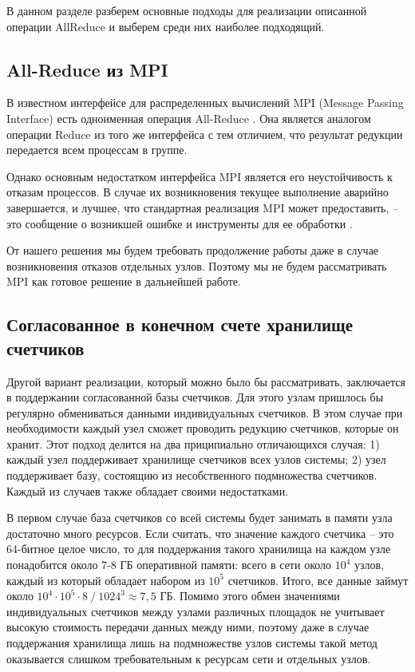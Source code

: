 \documentclass{article}
\theoremstyle{plain}
\theoremstyle{plain}
\theoremstyle{plain}
\theoremstyle{plain}
\theoremstyle{definition}
\theoremstyle{remark}
\theoremstyle{plain}
\begin{document}
В данном разделе разберем основные подходы для реализации описанной операции AllReduce и выберем среди них наиболее подходящий.

\subsection{All-Reduce из MPI}

В известном интерфейсе для распределенных вычислений MPI (Message Passing In\-ter\-face) есть одноименная операция All-Reduce \cite[стр.~238]{mpi_standard}. Она является аналогом операции Reduce из того же интерфейса с тем отличием, что результат редукции передается всем процессам в группе.

Однако основным недостатком интерфейса MPI является его неустойчивость к отказам процессов. В случае их возникновения текущее выполнение аварийно завершается, и лучшее, что стандартная реализация MPI может предоставить, -- это сообщение о возникшей ошибке и инструменты для ее обработки \cite[стр.~26]{mpi_standard}.

От нашего решения мы будем требовать продолжение работы даже в случае возникновения отказов отдельных узлов. Поэтому мы не будем рассматривать MPI как готовое решение в дальнейшей работе.

\subsection{Согласованное в конечном счете хранилище счетчиков}

Другой вариант реализации, который можно было бы рассматривать, заключается в поддержании согласованной базы счетчиков. Для этого узлам пришлось бы регулярно обмениваться данными индивидуальных счетчиков. В этом случае при необходимости каждый узел сможет проводить редукцию счетчиков, которые он хранит. Этот подход делится на два приципиально отличающихся случая: 1) каждый узел поддерживает хранилище счетчиков всех узлов системы; 2) узел поддерживает базу, состоящию из несобственного подмножества счетчиков. Каждый из случаев также обладает своими недостатками.

В первом случае база счетчиков со всей системы будет занимать в памяти узла достаточно много ресурсов. Если считать, что значение каждого счетчика -- это 64-битное целое число, то для поддержания такого хранилища на каждом узле понадобится около 7-8 ГБ оперативной памяти: всего в сети около $10^4$ узлов, каждый из который обладает набором из $10^5$ счетчиков. Итого, все данные займут около $10^4 \cdot 10^5 \cdot 8\ /\ 1024^3 \approx 7,5$ ГБ. Помимо этого обмен значениями индивидуальных счетчиков между узлами различных площадок не учитывает высокую стоимость передачи данных между ними, поэтому даже в случае поддержания хранилища лишь на подмножестве узлов системы такой метод оказывается слишком требовательным к ресурсам сети и отдельных узлов.
\end{document}
